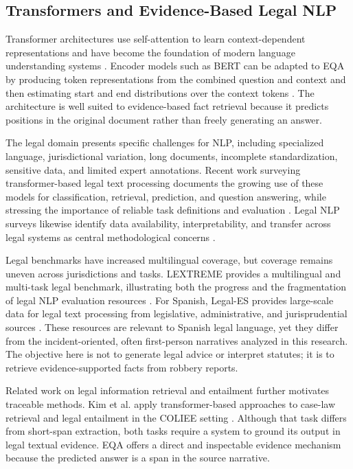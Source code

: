 \documentclass[graybox]{SNmult}
\begin{document}
\subsection{Transformers and Evidence-Based Legal NLP}

Transformer architectures use self-attention to learn context-dependent representations and have become the foundation of modern language understanding systems \cite{vaswani2017attention}. Encoder models such as BERT can be adapted to EQA by producing token representations from the combined question and context and then estimating start and end distributions over the context tokens \cite{devlin2019bert}. The architecture is well suited to evidence-based fact retrieval because it predicts positions in the original document rather than freely generating an answer.

The legal domain presents specific challenges for NLP, including specialized language, jurisdictional variation, long documents, incomplete standardization, sensitive data, and limited expert annotations. Recent work surveying transformer-based legal text processing documents the growing use of these models for classification, retrieval, prediction, and question answering, while stressing the importance of reliable task definitions and evaluation \cite{greco2024transformerlegal}. Legal NLP surveys likewise identify data availability, interpretability, and transfer across legal systems as central methodological concerns \cite{niklaus2021legalnlp}.

Legal benchmarks have increased multilingual coverage, but coverage remains uneven across jurisdictions and tasks. LEXTREME provides a multilingual and multi-task legal benchmark, illustrating both the progress and the fragmentation of legal NLP evaluation resources \cite{niklaus2023lextreme}. For Spanish, Legal-ES provides large-scale data for legal text processing from legislative, administrative, and jurisprudential sources \cite{gonzalez2020legales}. These resources are relevant to Spanish legal language, yet they differ from the incident-oriented, often first-person narratives analyzed in this research. The objective here is not to generate legal advice or interpret statutes; it is to retrieve evidence-supported facts from robbery reports.

Related work on legal information retrieval and entailment further motivates traceable methods. Kim et al. apply transformer-based approaches to case-law retrieval and legal entailment in the COLIEE setting \cite{kim2024legalir}. Although that task differs from short-span extraction, both tasks require a system to ground its output in legal textual evidence. EQA offers a direct and inspectable evidence mechanism because the predicted answer is a span in the source narrative.
\end{document}
